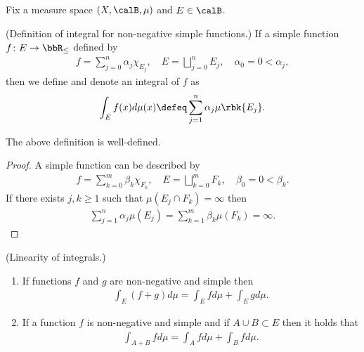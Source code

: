 \documentclass[openany, a4paper, oneside]{jsbook}
\begin{document}
Fix a measure space $(X, \calB, \mu)$ and $E \in \calB$.
\begin{defn}\textup{(Definition of integral for non-negative simple functions.)}
 If a simple function $f \colon E \to \bbR_{\leq}$ defined by
\begin{align}
 f
 =
 \sum_{j=0}^n \alpha_j \chi_{E_j}, \quad
 E
 =
 \bigsqcup_{j=0}^{n} E_j, \quad
 \alpha_0 = 0 < \alpha_j,
\end{align}
then we define and denote an integral of $f$ as
\begin{align}
 \int_E f (x) d\mu (x)
 \defeq
 \sum_{j=1}^n \alpha_j \mu \rbk{E_j}.
\end{align}
\end{defn}
\begin{thm}
 The above definition is well-defined.
\end{thm}
\begin{proof}
A simple function can be described by
\begin{align}
  f
  =
  \sum_{k=0}^m \beta_k \chi_{F_k}, \quad
  E
  =
  \bigsqcup_{k=0}^{m} F_k, \quad
  \beta_0 = 0 < \beta_k.
\end{align}
If there exists $j, k \geq 1$ such that $\mu (E_j \cap F_k) = \infty$ then
\begin{align}
 \sum_{j=1}^n \alpha_j \mu (E_j)
 =
 \sum_{k=1}^m \beta_k \mu (F_k)
 =
 \infty.
\end{align}
\end{proof}
\begin{lem}\textup{(Linearity of integrals.)}
\begin{enumerate}
\item If functions $f$ and $g$ are non-negative and simple then
\begin{align}
 \int_E (f+g) d \mu
 =
 \int_E f d \mu + \int_E g d \mu.
\end{align}
\item If a function $f$ is non-negative and simple and if $A \cup B \subset E$ then it holds that
\begin{align}
 \int_{A+B} f d\mu
 =
 \int_A f d \mu + \int_B f d \mu.
\end{align}
\end{enumerate}
\end{lem}
\end{document}
